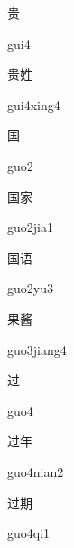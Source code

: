 \begin{multicols*}{2}
\begin{verbete}[gui4]{贵}
\begin{pronuncia}{gui4}
\end{pronuncia}
\end{verbete}

\begin{verbete}{贵姓}
\begin{pronuncia}{gui4xing4}
\end{pronuncia}
\end{verbete}

\begin{verbete}[guo2]{国}
\begin{pronuncia}{guo2}
\end{pronuncia}
\end{verbete}

\begin{verbete}{国家}
\begin{pronuncia}{guo2jia1}
\end{pronuncia}
\end{verbete}

\begin{verbete}[guo2yu3]{国语}
\begin{pronuncia}{guo2yu3}
\end{pronuncia}
\end{verbete}

\begin{verbete}{果酱}
\begin{pronuncia}{guo3jiang4}
\end{pronuncia}
\end{verbete}

\begin{verbete}[guo4]{过}
\begin{pronuncia}{guo4}
\end{pronuncia}
\end{verbete}

\begin{verbete}{过年}
\begin{pronuncia}{guo4nian2}
\end{pronuncia}
\end{verbete}

\begin{verbete}[guo4qi1]{过期}
\begin{pronuncia}{guo4qi1}
\end{pronuncia}
\end{verbete}

\end{multicols*}
